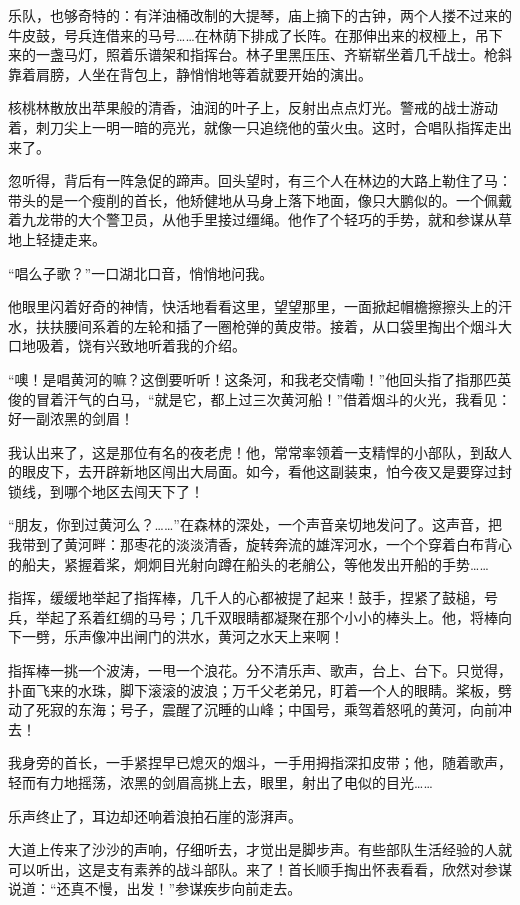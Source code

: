 \documentclass[12pt,UTF-8,openany]{ctexbook}
\begin{document}
\begin{large}
    乐队，也够奇特的：有洋油桶改制的大提琴，庙上摘下的古钟，两个人搂不过来的牛皮鼓，号兵连借来的马号……在林荫下排成了长阵。在那伸出来的杈桠上，吊下来的一盏马灯，照着乐谱架和指挥台。林子里黑压压、齐崭崭坐着几千战士。枪斜靠着肩膀，人坐在背包上，静悄悄地等着就要开始的演出。
    
    核桃林散放出苹果般的清香，油润的叶子上，反射出点点灯光。警戒的战士游动着，刺刀尖上一明一暗的亮光，就像一只追绕他的萤火虫。这时，合唱队指挥走出来了。
    
    忽听得，背后有一阵急促的蹄声。回头望时，有三个人在林边的大路上勒住了马：带头的是一个瘦削的首长，他矫健地从马身上落下地面，像只大鹏似的。一个佩戴着九龙带的大个警卫员，从他手里接过缰绳。他作了个轻巧的手势，就和参谋从草地上轻捷走来。
    
    “唱么子歌？”一口湖北口音，悄悄地问我。
    
    他眼里闪着好奇的神情，快活地看看这里，望望那里，一面掀起帽檐擦擦头上的汗水，扶扶腰间系着的左轮和插了一圈枪弹的黄皮带。接着，从口袋里掏出个烟斗大口地吸着，饶有兴致地听着我的介绍。
    
    “噢！是唱黄河的嘛？这倒要听听！这条河，和我老交情嘞！”他回头指了指那匹英俊的冒着汗气的白马，“就是它，都上过三次黄河船！”借着烟斗的火光，我看见：好一副浓黑的剑眉！
    
    我认出来了，这是那位有名的夜老虎！他，常常率领着一支精悍的小部队，到敌人的眼皮下，去开辟新地区闯出大局面。如今，看他这副装束，怕今夜又是要穿过封锁线，到哪个地区去闯天下了！
    
    “朋友，你到过黄河么？……”在森林的深处，一个声音亲切地发问了。这声音，把我带到了黄河畔：那枣花的淡淡清香，旋转奔流的雄浑河水，一个个穿着白布背心的船夫，紧握着桨，炯炯目光射向蹲在船头的老艄公，等他发出开船的手势……
    
    指挥，缓缓地举起了指挥棒，几千人的心都被提了起来！鼓手，捏紧了鼓槌，号兵，举起了系着红绸的马号；几千双眼睛都凝聚在那个小小的棒头上。他，将棒向下一劈，乐声像冲出闸门的洪水，黄河之水天上来啊！
    
    指挥棒一挑一个波涛，一甩一个浪花。分不清乐声、歌声，台上、台下。只觉得，扑面飞来的水珠，脚下滚滚的波浪；万千父老弟兄，盯着一个人的眼睛。桨板，劈动了死寂的东海；号子，震醒了沉睡的山峰；中国号，乘驾着怒吼的黄河，向前冲去！
    
    我身旁的首长，一手紧捏早已熄灭的烟斗，一手用拇指深扣皮带；他，随着歌声，轻而有力地摇荡，浓黑的剑眉高挑上去，眼里，射出了电似的目光……
    
    乐声终止了，耳边却还响着浪拍石崖的澎湃声。
    
    大道上传来了沙沙的声响，仔细听去，才觉出是脚步声。有些部队生活经验的人就可以听出，这是支有素养的战斗部队。来了！首长顺手掏出怀表看看，欣然对参谋说道：“还真不慢，出发！”参谋疾步向前走去。
    

\end{large}
\end{document}
